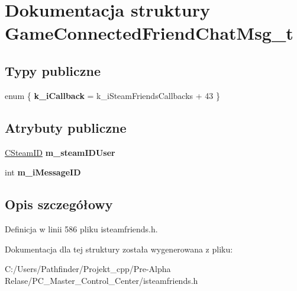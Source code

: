 \hypertarget{struct_game_connected_friend_chat_msg__t}{}\section{Dokumentacja struktury Game\+Connected\+Friend\+Chat\+Msg\+\_\+t}
\label{struct_game_connected_friend_chat_msg__t}
\subsection*{Typy publiczne}
\begin{DoxyCompactItemize}
\item 
\mbox{\label{struct_game_connected_friend_chat_msg__t_a7e059a3623c4a29e6c44f8d2da6aec10}} 
enum \{ {\bfseries k\+\_\+i\+Callback} = k\+\_\+i\+Steam\+Friends\+Callbacks + 43
 \}
\end{DoxyCompactItemize}
\subsection*{Atrybuty publiczne}
\begin{DoxyCompactItemize}
\item 
\mbox{\label{struct_game_connected_friend_chat_msg__t_a3e41fe3f474ceab3f22999e714b3bb30}} 
\hyperlink{class_c_steam_i_d}{C\+Steam\+ID} {\bfseries m\+\_\+steam\+I\+D\+User}
\item 
\mbox{\label{struct_game_connected_friend_chat_msg__t_add465c6a6e103119e9531527491dc650}} 
int {\bfseries m\+\_\+i\+Message\+ID}
\end{DoxyCompactItemize}


\subsection{Opis szczegółowy}


Definicja w linii 586 pliku isteamfriends.\+h.



Dokumentacja dla tej struktury została wygenerowana z pliku\+:\begin{DoxyCompactItemize}
\item 
C\+:/\+Users/\+Pathfinder/\+Projekt\+\_\+cpp/\+Pre-\/\+Alpha Relase/\+P\+C\+\_\+\+Master\+\_\+\+Control\+\_\+\+Center/isteamfriends.\+h\end{DoxyCompactItemize}
